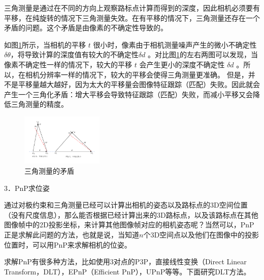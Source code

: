 三角测量是通过在不同的方向上观察路标点计算而得到的深度，因此相机必须要有平移，在纯旋转的情况下三角测量失效。在有平移的情况下，三角测量还存在一个矛盾的问题。这个矛盾是由像素的不确定性导致的。

如图\ref{fig3_11}所示，当相机的平移 $t$ 很小时，像素由于相机测量噪声产生的微小不确定性 $\delta \theta $，将导致计算的深度值有较大的不确定性$\delta d $ 。对比图\ref{fig3_11}的左右两图可以发现，当像素不确定性一样的情况下，较大的平移  $t$ 会产生更小的深度不确定性 $\delta d $ 。所以，在相机分辨率一样的情况下，较大的平移会使得三角测量更准确。
但是，并不是平移量越大越好，因为太大的平移量会图像特征跟踪（匹配）失败。因此就会产生一个三角化矛盾：增大平移会导致特征跟踪（匹配）失败，而减小平移又会降低三角测量的精度。
\begin{figure}[h]\setlength{\belowcaptionskip}{-12pt}
	\centering
	\includegraphics[width=0.35\textwidth, angle=-90]{figures/chapter3/fig3_11}
	\caption{三角测量的矛盾}\label{fig3_11}
\end{figure}

3．PnP求位姿

通过对极约束和三角测量已经可以计算出相机的姿态以及路标点的3D空间位置（没有尺度信息），那么能否根据已经计算出来的3D路标点，以及该路标点在其他图像帧中的2D投影坐标，来计算其他图像帧对应的相机姿态呢？当然可以，PnP正是求解此问题的方法，也就是说，当知道$n$个3D空间点以及他们在图像中的投影位置时，可以用PnP来求解相机的位姿。

求解PnP有很多种方法，比如使用3对点的P3P，直接线性变换（Direct Linear Transform，DLT），EPnP（Efficient PnP），UPnP等等。下面研究DLT方法。

